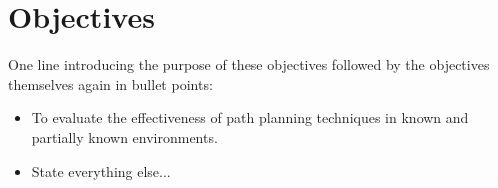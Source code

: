 \newpage

\section{Objectives}

\noindent
One line introducing the purpose of these objectives followed by the objectives themselves again in bullet points:

\begin{itemize}
\item To evaluate the effectiveness of path planning techniques in known and partially known environments.

\item State everything else...
\end{itemize}



